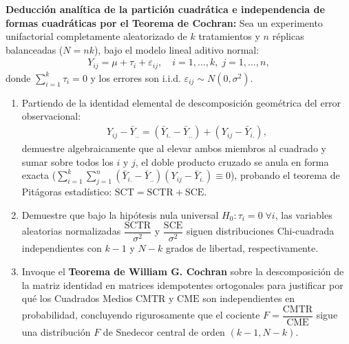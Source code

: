 \begin{problema}
	\label{prob:anova_desaf_cochran}
	\textbf{Deducción analítica de la partición cuadrática e independencia de formas cuadráticas por el Teorema de Cochran:}
	Sea un experimento unifactorial completamente aleatorizado de $k$ tratamientos y $n$ réplicas balanceadas ($N = nk$), bajo el modelo lineal aditivo normal:
	\begin{align}
		Y_{ij} = \mu + \tau_i + \varepsilon_{ij}, \quad i=1, \dots, k, \; j=1, \dots, n,
	\end{align}
	donde $\sum_{i=1}^k \tau_i = 0$ y los errores son i.i.d. $\varepsilon_{ij} \sim N(0, \sigma^2)$.
	\begin{enumerate}
		\item Partiendo de la identidad elemental de descomposición geométrica del error observacional:
		\begin{align}
			Y_{ij} - \bar{Y}_{..} = (\bar{Y}_{i.} - \bar{Y}_{..}) + (Y_{ij} - \bar{Y}_{i.}),
		\end{align}
		demuestre algebraicamente que al elevar ambos miembros al cuadrado y sumar sobre todos los $i$ y $j$, el doble producto cruzado se anula en forma exacta ($\sum_{i=1}^k \sum_{j=1}^n (\bar{Y}_{i.} - \bar{Y}_{..})(Y_{ij} - \bar{Y}_{i.}) \equiv 0$), probando el teorema de Pitágoras estadístico: $\text{SCT} = \text{SCTR} + \text{SCE}$.
		\item Demuestre que bajo la hipótesis nula universal $H_0: \tau_i = 0 \; \forall i$, las variables aleatorias normalizadas $\dfrac{\text{SCTR}}{\sigma^2}$ y $\dfrac{\text{SCE}}{\sigma^2}$ siguen distribuciones Chi-cuadrada independientes con $k-1$ y $N-k$ grados de libertad, respectivamente.
		\item Invoque el \textbf{Teorema de William G. Cochran} sobre la descomposición de la matriz identidad en matrices idempotentes ortogonales para justificar por qué los Cuadrados Medios $\text{CMTR}$ y $\text{CME}$ son independientes en probabilidad, concluyendo rigurosamente que el cociente $F = \dfrac{\text{CMTR}}{\text{CME}}$ sigue una distribución $F$ de Snedecor central de orden $(k-1, N-k)$.
	\end{enumerate}
\end{problema}

